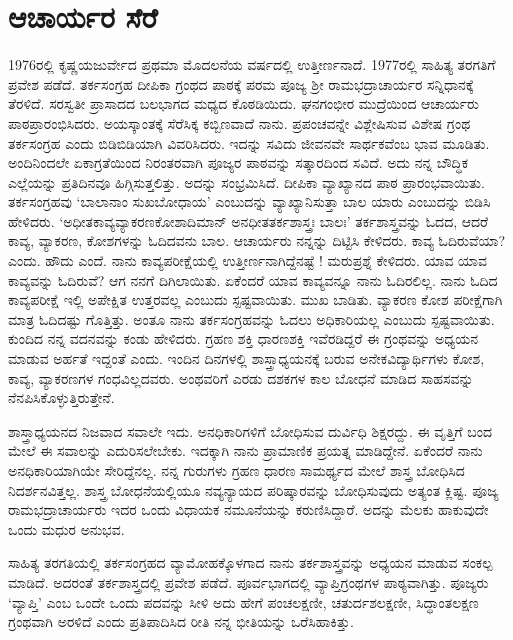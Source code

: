 {\section*{ಆಚಾರ್ಯರ ಸೆರೆ}

1976ರಲ್ಲಿ  ಕೃಷ್ಣಯಜುರ್ವೇದ ಪ್ರಥಮಾ ಮೊದಲನೆಯ ವರ್ಷದಲ್ಲಿ ಉತ್ತೀರ್ಣನಾದೆ.  1977ರಲ್ಲಿ ಸಾಹಿತ್ಯ ತರಗತಿಗೆ ಪ್ರವೇಶ ಪಡೆದೆ.  ತರ್ಕಸಂಗ್ರಹ ದೀಪಿಕಾ ಗ್ರಂಥದ ಪಾಠಕ್ಕೆ ಪರಮ ಪೂಜ್ಯ ಶ್ರೀ ರಾಮಭದ್ರಾಚಾರ್ಯರ ಸನ್ನಿಧಾನಕ್ಕೆ ತೆರಳಿದೆ.  \hbox{ಸರಸ್ವತೀ} ಪ್ರಾಸಾದದ ಬಲಭಾಗದ ಮಧ್ಯದ ಕೊಠಡಿಯಿದು.  ಘನಗಂಭೀರ ಮುದ್ರೆಯಿಂದ \hbox{ಆಚಾರ್ಯರು} ಪಾಠಪ್ರಾರಂಭಿಸಿದರು.  ಅಯಸ್ಕಾಂತಕ್ಕೆ ಸೆರೆಸಿಕ್ಕ ಕಬ್ಬಿಣವಾದೆ ನಾನು.  ಪ್ರಪಂಚವನ್ನೇ ವಿಶ್ಲೇಷಿಸುವ ವಿಶೇಷ ಗ್ರಂಥ ತರ್ಕಸಂಗ್ರಹ ಎಂದು ಬಿಡಿಬಿಡಿಯಾಗಿ ವಿವರಿಸಿದರು. ಇದನ್ನು ಸವಿದು ಜೀವನವೇ ಸಾರ್ಥಕವೆಂಬ ಭಾವ ಮೂಡಿತು.  ಅಂದಿ\-ನಿಂದಲೇ ಏಕಾಗ್ರತೆಯಿಂದ ನಿರಂತರವಾಗಿ ಪೂಜ್ಯರ ಪಾಠವನ್ನು ಸತ್ಕಾರದಿಂದ ಸವಿದೆ.  ಅದು ನನ್ನ ಬೌದ್ಧಿಕ ಎಲ್ಲೆಯನ್ನು ಪ್ರತಿದಿನವೂ ಹಿಗ್ಗಿಸುತ್ತಲಿತ್ತು.  ಅದನ್ನು \hbox{ಸಂಭ್ರಮಿಸಿದೆ.}  ದೀಪಿಕಾ ವ್ಯಾಖ್ಯಾನದ ಪಾಠ ಪ್ರಾರಂಭವಾಯಿತು. ತರ್ಕಸಂಗ್ರಹವು ‘\hbox{ಬಾಲಾನಾಂ} ಸುಖ\-ಬೋಧಾಯ’ ಎಂಬುದನ್ನು ವ್ಯಾಖ್ಯಾನಿಸುತ್ತಾ ಬಾಲ ಯಾರು ಎಂಬುದನ್ನು ಬಿಡಿಸಿ ಹೇಳಿದರು.  ‘ಅಧೀತಕಾವ್ಯವ್ಯಾಕರಣಕೋಶಾದಿಮಾನ್ ಅನಧೀತತರ್ಕಶಾಸ್ತ್ರಃ ಬಾಲಃ’  \enginline{-}   ತರ್ಕಶಾಸ್ತ್ರವನ್ನು ಓದದ, ಆದರೆ ಕಾವ್ಯ, ವ್ಯಾಕರಣ, ಕೋಶಗಳನ್ನು ಓದಿದವನು ಬಾಲ.  ಆಚಾರ್ಯರು ನನ್ನನ್ನು ದಿಟ್ಟಿಸಿ ಕೇಳಿದರು.  ಕಾವ್ಯ ಓದಿರುವೆಯಾ? ಎಂದು.  ಹೌದು ಎಂದೆ.  ನಾನು ಕಾವ್ಯಪರೀಕ್ಷೆಯಲ್ಲಿ ಉತ್ತೀರ್ಣನಾಗಿದ್ದೆನಷ್ಟೆ !  ಮರುಪ್ರಶ್ನೆ ಕೇಳಿದರು.  ಯಾವ ಯಾವ ಕಾವ್ಯವನ್ನು ಓದಿರುವೆ?  ಆಗ ನನಗೆ ದಿಗಿಲಾಯಿತು.  ಏಕೆಂದರೆ ಯಾವ ಕಾವ್ಯವನ್ನೂ ನಾನು ಓದಿರಲಿಲ್ಲ.  ನಾನು ಓದಿದ ಕಾವ್ಯಪರೀಕ್ಷೆ ಇಲ್ಲಿ ಅಪೇಕ್ಷಿತ ಉತ್ತರ\-ವಲ್ಲ ಎಂಬುದು ಸ್ಪಷ್ಟವಾಯಿತು.  ಮುಖ ಬಾಡಿತು.  ವ್ಯಾಕರಣ ಕೋಶ ಪರೀಕ್ಷೆಗಾಗಿ ಮಾತ್ರ ಓದಿದಷ್ಟು ಗೊತ್ತಿತ್ತು. ಅಂತೂ ನಾನು ತರ್ಕಸಂಗ್ರಹವನ್ನು ಓದಲು ಅಧಿಕಾರಿಯಲ್ಲ ಎಂಬುದು ಸ್ಪಷ್ಟವಾಯಿತು.  ಕುಂದಿದ ನನ್ನ ವದನವನ್ನು ಕಂಡು ಹೇಳಿದರು.  ಗ್ರಹಣ ಶಕ್ತಿ ಧಾರಣಶಕ್ತಿ ಇವೆರಡಿದ್ದರೆ ಈ ಗ್ರಂಥವನ್ನು ಅಧ್ಯಯನ ಮಾಡುವ ಅರ್ಹತೆ ಇದ್ದಂತೆ ಎಂದು.  ಇಂದಿನ ದಿನಗಳಲ್ಲಿ ಶಾಸ್ತ್ರಾಧ್ಯಯನಕ್ಕೆ ಬರುವ ಅನೇಕ\break ವಿದ್ಯಾರ್ಥಿಗಳು ಕೋಶ, ಕಾವ್ಯ, ವ್ಯಾಕರಣಗಳ ಗಂಧವಿಲ್ಲದವರು.  ಅಂಥವರಿಗೆ ಎರಡು ದಶಕಗಳ ಕಾಲ ಬೋಧನೆ ಮಾಡಿದ ಸಾಹಸವನ್ನು ನೆನಪಿಸಿಕೊಳ್ಳುತ್ತಿರುತ್ತೇನೆ.    

ಶಾಸ್ತ್ರಾಧ್ಯಯನದ ನಿಜವಾದ ಸವಾಲೇ ಇದು.  ಅನಧಿಕಾರಿಗಳಿಗೆ ಬೋಧಿಸುವ ದುರ್ವಿಧಿ ಶಿಕ್ಷರದ್ದು.  ಈ ವೃತ್ತಿಗೆ ಬಂದ ಮೇಲೆ ಈ ಸವಾಲನ್ನು ಎದುರಿಸಲೇಬೇಕು.  ಇದಕ್ಕಾಗಿ ನಾನು ಪ್ರಾಮಾಣಿಕ ಪ್ರಯತ್ನ ಮಾಡಿದ್ದೇನೆ.  ಏಕೆಂದರೆ ನಾನು ಅನಧಿಕಾರಿ\-ಯಾಗಿಯೇ ಸೇರಿದ್ದೆನಲ್ಲ.  ನನ್ನ ಗುರುಗಳು ಗ್ರಹಣ ಧಾರಣ ಸಾಮರ್ಥ್ಯದ ಮೇಲೆ ಶಾಸ್ತ್ರ ಬೋಧಿಸಿದ ನಿದರ್ಶನವಿತ್ತಲ್ಲ.  ಶಾಸ್ತ್ರ ಬೋಧನೆಯಲ್ಲಿಯೂ ನವ್ಯನ್ಯಾಯದ ಪರಿಷ್ಕಾರವನ್ನು ಬೋಧಿಸುವುದು ಅತ್ಯಂತ ಕ್ಲಿಷ್ಟ.  ಪೂಜ್ಯ ರಾಮಭದ್ರಾಚಾರ್ಯರು ಇದರ ಒಂದು ವಿಧಾಯಕ ನಮೂನೆಯನ್ನು ಕರುಣಿಸಿದ್ದಾರೆ. ಅದನ್ನು ಮೆಲಕು ಹಾಕುವುದೇ ಒಂದು ಮಧುರ ಅನುಭವ.  

ಸಾಹಿತ್ಯ ತರಗತಿಯಲ್ಲಿ ತರ್ಕಸಂಗ್ರಹದ ವ್ಯಾಮೋಹಕ್ಕೊಳಗಾದ ನಾನು ತರ್ಕಶಾಸ್ತ್ರವನ್ನು ಅಧ್ಯಯನ ಮಾಡುವ ಸಂಕಲ್ಪ ಮಾಡಿದೆ.  ಅದರಂತೆ ತರ್ಕಶಾಸ್ತ್ರದಲ್ಲಿ ಪ್ರವೇಶ ಪಡೆದೆ.  ಪೂರ್ವಭಾಗದಲ್ಲಿ ವ್ಯಾಪ್ತಿಗ್ರಂಥಗಳ ಪಾಠ್ಯವಾಗಿತ್ತು.  ಪೂಜ್ಯರು ‘ವ್ಯಾಪ್ತಿ’ ಎಂಬ ಒಂದೇ ಒಂದು ಪದವನ್ನು ಸೀಳಿ ಅದು ಹೇಗೆ ಪಂಚಲಕ್ಷಣೀ, ಚತುರ್ದಶಲಕ್ಷಣೀ, ಸಿದ್ಧಾಂತಲಕ್ಷಣ ಗ್ರಂಥವಾಗಿ ಅರಳಿದೆ ಎಂದು ಪ್ರತಿಪಾದಿಸಿದ ರೀತಿ ನನ್ನ ಭೀತಿಯನ್ನು ಒರೆಸಿಹಾಕಿತ್ತು.  

}
